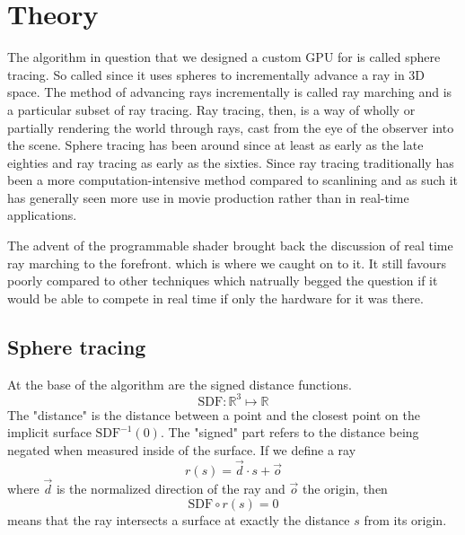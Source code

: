 \chapter{Theory}

	The algorithm in question that we designed a custom GPU for is called
	sphere tracing.\cite{Hart1996} So called since it uses spheres to
	incrementally advance a ray in 3D space. The method of advancing rays
	incrementally is called ray marching and is a particular subset of ray
	tracing.\cite{Whitted1980} Ray tracing, then, is a way of wholly or
	partially rendering the world through rays, cast from the eye of the
	observer into the scene.  Sphere tracing has been around since at least as
	early as the late eighties and ray tracing as early as the
	sixties.\cite{Hart1989,Appel1968} Since ray tracing traditionally has been
	a more computation-intensive method compared to scanlining\cite{Wylie1967}
	and as such it has generally seen more use in movie production rather than
	in real-time applications.\cite{ref_needed?} 
	
	
	The advent of the programmable shader brought back the discussion of real
	time ray marching to the forefront. which is where we caught on to it.
	\cite{JamieWong2016} It still favours poorly compared to other techniques
	which natrually begged the question if it would be able to compete in real
	time if only the hardware for it was there.
	
	\section{Sphere tracing} 
	
		\begin{minipage}{0.6\textwidth} 
		
			At the base of the algorithm are the signed distance functions.
			$$\text{SDF}:\mathbb{R}^{3}\mapsto\mathbb{R}$$ The "distance" is
			the distance between a point and the closest point on the implicit
			surface $\text{SDF}^{-1}(0)$. The "signed" part refers to the
			distance being negated when measured inside of the surface.  If we
			define a ray $$r(s) = \vec{d} \cdot s + \vec{o}$$ where $\vec{d}$
			is the normalized direction of the ray and $\vec{o}$ the origin,
			then $$\text{SDF}\circ r(s) = 0$$ means that the ray intersects a
			surface at exactly the distance $s$ from its origin.
		
		\end{minipage} 
		
